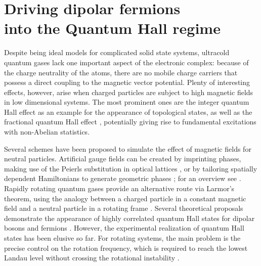 
\chapter[Driving dipolar fermions into the Quantum Hall regime]{Driving dipolar fermions\texorpdfstring{\\}{ }into the Quantum Hall regime}




Despite being ideal models for complicated solid state systems, ultracold quantum gases lack one important aspect of the electronic complex: because of the charge neutrality of the atoms, there are no mobile charge carriers that possess a direct coupling to the magnetic vector potential. Plenty of interesting effects, however, arise when charged particles are subject to high magnetic fields in low dimensional systems. The most prominent ones are the integer quantum Hall effect \cite{Klitzing1980} as an example for the appearance of topological states, as well as the fractional quantum Hall effect \cite{Laughlin1983}, potentially giving rise to fundamental excitations with non-Abelian statistics.

Several schemes have been proposed to simulate the effect of magnetic fields for neutral particles. Artificial gauge fields can be created by imprinting phases, making use of the Peierls substitution in optical lattices \cite{Aidelsburger2011,Jimenez-Garcia2012,Struck2012}, or by tailoring spatially dependent Hamiltonians to generate geometric phases \cite{Lin2009}; for an overview see \cite{Dalibard2011}. Rapidly rotating quantum gases provide an alternative route via Larmor's theorem, using the analogy between a charged particle in a constant magnetic field and a neutral particle in a rotating frame
\cite{Cooper2008,Fetter2009}. Several theoretical proposals demonstrate the appearance of highly correlated quantum Hall states for dipolar bosons \cite{Cooper2005} and fermions \cite{Baranov2005,Osterloh2007}. However, the experimental realization of quantum Hall states has been elusive so far. For rotating systems, the main problem is the precise control on the rotation frequency, which is required to reach the lowest Landau level without crossing the rotational instability \cite{Schweikhard2004}.

